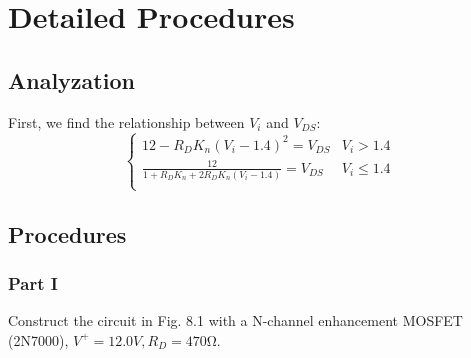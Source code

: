 \section{Detailed Procedures}
    \subsection{Analyzation}
    First, we find the relationship between $V_i$ and $V_{DS}$:
    \begin{equation}
        \begin{cases}
            12-R_DK_n(V_i-1.4)^2=V_{DS} & V_i>1.4\\
            \frac{12}{1+R_DK_n+2R_DK_n(V_i-1.4)}=V_{DS} & V_i\le1.4\\
        \end{cases}
    \end{equation}

    \subsection{Procedures}
    \subsubsection{Part I}
    Construct the circuit in Fig. 8.1 with a N-channel enhancement MOSFET (2N7000), $V^+ = 12.0V,R_D = 470Ω$.
    
